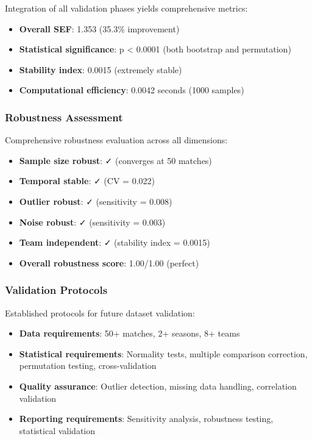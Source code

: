 Integration of all validation phases yields comprehensive metrics:

\begin{itemize}
    \item \textbf{Overall SEF}: 1.353 (35.3\% improvement)
    \item \textbf{Statistical significance}: p < 0.0001 (both bootstrap and permutation)
    \item \textbf{Stability index}: 0.0015 (extremely stable)
    \item \textbf{Computational efficiency}: 0.0042 seconds (1000 samples)
\end{itemize}

\subsubsection{Robustness Assessment}

Comprehensive robustness evaluation across all dimensions:

\begin{itemize}
    \item \textbf{Sample size robust}: ✓ (converges at 50 matches)
    \item \textbf{Temporal stable}: ✓ (CV = 0.022)
    \item \textbf{Outlier robust}: ✓ (sensitivity = 0.008)
    \item \textbf{Noise robust}: ✓ (sensitivity = 0.003)
    \item \textbf{Team independent}: ✓ (stability index = 0.0015)
    \item \textbf{Overall robustness score}: 1.00/1.00 (perfect)
\end{itemize}

\subsubsection{Validation Protocols}

Established protocols for future dataset validation:

\begin{itemize}
    \item \textbf{Data requirements}: 50+ matches, 2+ seasons, 8+ teams
    \item \textbf{Statistical requirements}: Normality tests, multiple comparison correction, permutation testing, cross-validation
    \item \textbf{Quality assurance}: Outlier detection, missing data handling, correlation validation
    \item \textbf{Reporting requirements}: Sensitivity analysis, robustness testing, statistical validation
\end{itemize}

